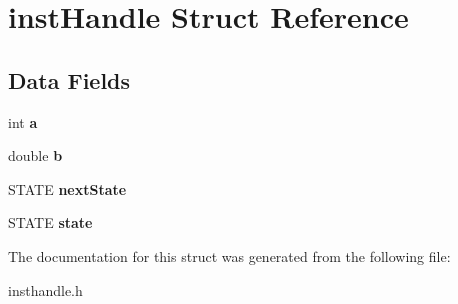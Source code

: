 \hypertarget{structinstHandle}{}\section{inst\+Handle Struct Reference}
\label{structinstHandle}
\subsection*{Data Fields}
\begin{DoxyCompactItemize}
\item 
int {\bfseries a}\hypertarget{structinstHandle_aeba0589311e884a9141934eb3a5d4250}{}\label{structinstHandle_aeba0589311e884a9141934eb3a5d4250}

\item 
double {\bfseries b}\hypertarget{structinstHandle_acc242075437eb12f45c51fd0bb204581}{}\label{structinstHandle_acc242075437eb12f45c51fd0bb204581}

\item 
S\+T\+A\+TE {\bfseries next\+State}\hypertarget{structinstHandle_aa01d55b3a34a7070597b43903b10a166}{}\label{structinstHandle_aa01d55b3a34a7070597b43903b10a166}

\item 
S\+T\+A\+TE {\bfseries state}\hypertarget{structinstHandle_a8e47a7a12112c04a81f7311e81a2bd43}{}\label{structinstHandle_a8e47a7a12112c04a81f7311e81a2bd43}

\end{DoxyCompactItemize}


The documentation for this struct was generated from the following file\+:\begin{DoxyCompactItemize}
\item 
insthandle.\+h\end{DoxyCompactItemize}
